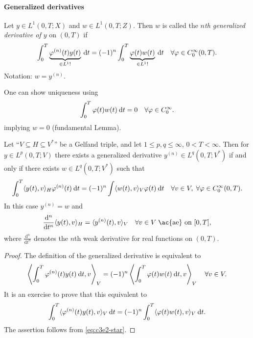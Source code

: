\documentclass[../skript.tex]{subfiles}
\begin{document}
\paragraph{Generalized derivatives}
\begin{definition} %
\label{def:c3e13}
Let $y \in L^1(0, T; X)$ and $w \in L^1(0, T; Z)$. Then $w$ is called the \emph{$n$th generalized derivative of $y$} on $(0, T)$ if
\[
	\int_0^T \underbrace{\varphi^{(n)}(t) y(t)}_{\in L^1 !} \:\mathrm{d}t = (-1)^n \int_0^T \underbrace{ \varphi(t) w(t) }_{\in L^1 !} \:\mathrm{d}t \quad \forall \varphi \in C_0^\infty(0, T).
\]
Notation: $w = y^{(n)}$.
\end{definition}
One can show uniqueness using
\[
	\int_0^T \varphi(t) w(t) \:\mathrm{d}t = 0 \quad \forall \varphi \in C_0^\infty.
\]
implying $w = 0$ (fundamental Lemma).
\begin{proposition}[Existence] %
\label{thm:c3e14}
Let ``$V \subseteq H \subseteq V^*$'' be a Gelfand triple, and let $1 \leq p, q \leq \infty$, $0 < T < \infty$.
Then for $y \in L^p(0, T; V)$ there exists a generalized derivative $y^{(n)} \in L^q(0, T; V^*)$ if and only if there exists $w \in L^q(0, T; V^*)$ such that
\[
	\int_0^T \langle y(t), v \rangle_H \varphi^{(n)}(t) \:\mathrm{d}t = (-1)^n \int \langle w(t), v \rangle_V \varphi(t) \:\mathrm{d}t \quad \forall v \in V, \; \forall \varphi \in C_0^\infty(0, T).
\]
In this case $y^{(n)} = w$ and
\[
	\frac{\mathrm{d}^n}{\mathrm{d} t^n} \langle y(t), v \rangle_H = \langle y^{(n)}(t), v \rangle_V \quad \forall v \in V \; \text{\ac{ae} on } [0, T],
\]
where $\frac{\mathrm{d}^n}{\mathrm{d} t^n}$ denotes the $n$th weak derivative for real functions on $(0, T)$.
\end{proposition}
\begin{proof}
The definition of the generalized derivative is equivalent to 
\[
	\left\langle \int_0^T \varphi^{(n)}(t) y(t) \:\mathrm{d}t, v \right\rangle_V = (-1)^n \left\langle \int_0^T \varphi(t) w(t) \:\mathrm{d}t, v \right\rangle_V \quad \forall v \in V.
\]
It is an exercise to prove that this equivalent to
\[
	\int_0^T \langle \varphi^{(n)} (t) y(t), v \rangle_V \:\mathrm{d}t = (-1)^n \int_0^T \langle \varphi(t) w(t), v \rangle_V \:\mathrm{d}t.
\]
The assertion follows from \cref{eq:c3e2-star}.
\end{proof}
\pagebreak
\end{document}
